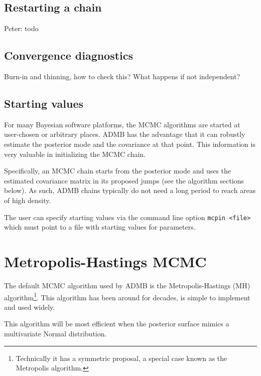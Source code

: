 \documentclass{article}\usepackage[]{graphicx}\usepackage[]{color}
\begin{document}
\subsection{Restarting a chain}\label{sec:restart}
Peter: todo
\subsection{Convergence diagnostics} \label{sec:diag}
Burn-in and thinning, how to check this? What happens if not
independent?
\subsection{Starting values}\label{sec:startvals}
For many Bayesian software platforms, the MCMC algorithms
are started at user-chosen or arbitrary places. ADMB has the
advantage that it can robustly estimate the posterior mode
and the covariance at that point. This information is very
valuable in initializing the MCMC chain.

Specifically, an MCMC chain starts from the posterior mode
and uses the estimated covariance matrix in its proposed
jumps (see the algorithm sections below). As such, ADMB
chains typically do not need a long period to reach areas of
high density.

The user can specify starting values via the command line
option \texttt{mcpin <file>} which must point to a file with
starting values for parameters.

\section{Metropolis-Hastings MCMC}\label{sec:MH}
The default MCMC algorithm used by ADMB is the
Metropolis-Hastings (MH) algorithm\footnote{Technically it
  has a symmetric proposal, a special case known as the
  Metropolis algorithm.}. This algorithm has been around for
decades, is simple to implement and used widely.

This algorithm will be most efficient when the posterior
surface mimics a multivariate Normal distribution.
\end{document}
